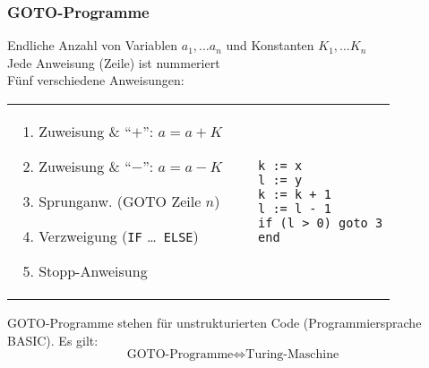 \subsubsection{GOTO-Programme}
Endliche Anzahl von Variablen $a_1, \dots a_n$ und Konstanten $K_1, \dots K_n$\\
Jede Anweisung (Zeile) ist nummeriert\\
Fünf verschiedene Anweisungen:
\lstset{numbers=left, stepnumber=1, firstnumber=1, numberfirstline=true, language=ada}
\begin{tabular}{lcl}
\begin{minipage}{0.55\linewidth}
	\begin{enumerate}\itemsep0em
		\item Zuweisung \& \enquote{$+$}: $a = a + K$
		\item Zuweisung \& \enquote{$-$}: $a = a - K$
		\item Sprunganw. (GOTO Zeile $n$)
		\item Verzweigung (\texttt{IF} \dots\ \texttt{ELSE})
		\item Stopp-Anweisung
	\end{enumerate}
\end{minipage}
& ~
&
\begin{minipage}{0.35\linewidth}
\begin{lstlisting}
k := x
l := y
k := k + 1
l := l - 1
if (l > 0) goto 3
end
\end{lstlisting}
\end{minipage}
\end{tabular}
GOTO-Programme stehen für unstrukturierten Code (Programmiersprache BASIC). Es gilt:
\begin{equation*}
	\mbox{GOTO-Programme} \Leftrightarrow \mbox{Turing-Maschine}
\end{equation*}


